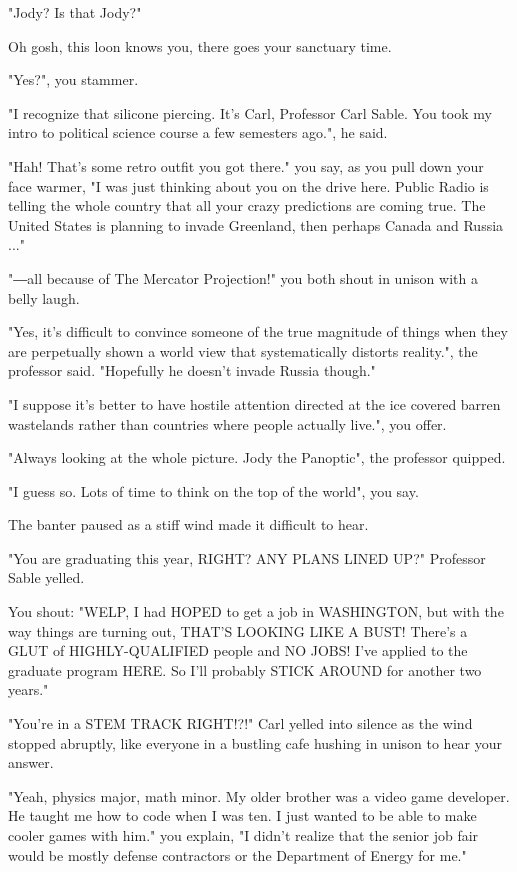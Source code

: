\documentclass[a5paper, symmetric]{tufte-book}
\begin{document}
"Jody? Is that Jody?"

Oh gosh, this loon knows you, there goes your sanctuary time. 

"Yes?", you stammer. 

"I recognize that silicone piercing. It's Carl, Professor Carl Sable. You took my intro to political science course a few semesters ago.", he said.

"Hah! That's some retro outfit you got there." you say, as you pull down your face warmer, "I was just thinking about you on the drive here. Public Radio is telling the whole country that all your crazy predictions are coming true. The United States is planning to invade Greenland, then perhaps Canada and Russia ..." 

"―all because of The Mercator Projection!" you both shout in unison with a belly laugh.

"Yes, it's difficult to convince someone of the true magnitude of things when they are perpetually shown a world view that systematically distorts reality.", the professor said. "Hopefully he doesn't invade Russia though." 

"I suppose it's better to have hostile attention directed at the ice covered barren wastelands rather than countries where people actually live.", you offer. 

"Always looking at the whole picture. Jody the Panoptic", the professor quipped. 

"I guess so. Lots of time to think on the top of the world", you say. 

The banter paused as a stiff wind made it difficult to hear.

"You are graduating this year, RIGHT? ANY PLANS LINED UP?" Professor Sable yelled.   

You shout: "WELP, I had HOPED to get a job in WASHINGTON, but with the way things are turning out, THAT'S LOOKING LIKE A BUST! There's a GLUT of HIGHLY-QUALIFIED people and NO JOBS! I've applied to the graduate program HERE. So I'll probably STICK AROUND for another two years."

"You're in a STEM TRACK RIGHT!?!" Carl yelled into silence as the wind stopped abruptly, like everyone in a bustling cafe hushing in unison to hear your answer.

"Yeah, physics major, math minor. My older brother was a video game developer. He taught me how to code when I was ten. I just wanted to be able to make cooler games with him." you explain, "I didn't realize that the senior job fair would be mostly defense contractors or the Department of Energy for me." 
\end{document}
